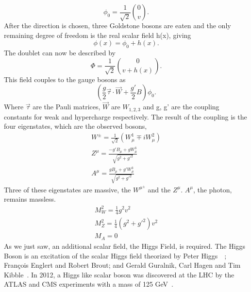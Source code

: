  
\begin{equation}
\phi_{0} = \frac{1}{\sqrt{2}} \binom{0}{v}.
\end{equation}
After the direction is chosen, three Goldstone bosons are eaten and the only remaining degree of freedom is the real scalar field h(x), giving 
\begin{equation}
\phi(x) = \phi_{0} + h(x).
\end{equation}
The doublet can now be described by 
\begin{equation}
\Phi = \frac{1}{\sqrt{2}} \binom{0}{v+h(x)}.
\end{equation}
This field couples to the gauge bosons as 
\begin{equation}
(\frac{g}{2}\overrightarrow{\tau}\cdot \overrightarrow{W} + \frac{g'}{2}B)\phi_{0}.
\end{equation}
Where ${\overrightarrow{\tau}}$ are the Pauli matrices, ${\overrightarrow{W}}$ are ${W_{1,2,3}}$ and g, g' are the coupling constants for weak and hypercharge respectively. The result of the coupling is the four eigenstates, which are the observed bosons, 
\begin{equation}
\begin{split}
W^{\pm} = \frac{1}{\sqrt{2}}(W^{1}_{\mu} \mp iW^{2}_{\mu})\\
Z^{\mu} = \frac{-g'B_{\mu} + gW^{3}_{\mu}}{\sqrt{g^{2} + g'^{2}}}\\
A^{\mu} = \frac{gB_{\mu} + g'W^{3}_{\mu}}{\sqrt{g^{2} + g'^{2}}}
\end{split}
\end{equation}
Three of these eigenstates are massive, the $W^{\mu^{\pm}}$ and the $Z^{\mu}$. $A^{\mu}$, the photon, remains massless.
\begin{equation}
\begin{split}
M^{2}_{W} = \frac{1}{4}g^{2}v^{2} \\
M^{2}_{Z} = \frac{1}{4}(g^{2} + g'^{2})v^{2} \\
M_{A} = 0
\end{split}
\end{equation}
As we just saw, an additional scalar field, the Higgs Field, is required.\newline
\indent The Higgs Boson is an excitation of the scalar Higgs field theorized by Peter Higgs~\cite{PhysRevLett.13.508}~\cite{HIGGS1964132}; François Englert and Robert Brout\cite{PhysRevLett.13.321}; and Gerald Guralnik, Carl Hagen and Tim Kibble~\cite{PhysRevLett.13.585}. In 2012, a Higgs like scalar boson was discovered at the LHC by the ATLAS and CMS experiments with a mass of 125 GeV~\cite{Aad:2012tfa}.


